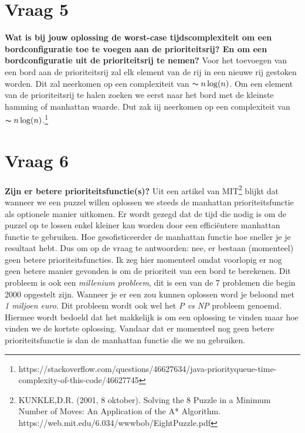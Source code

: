 \documentclass[12pt, letterpaper]{article}
\begin{document}
\section{Vraag 5}
\textbf{Wat is bij jouw oplossing de worst-case tijdscomplexiteit om een bordconfiguratie toe te voegen aan de prioriteitsrij? En om een bordconfiguratie uit de prioriteitsrij te nemen?}\newline
Voor het toevoegen van een bord aan de prioriteitsrij zal elk element van de rij in een nieuwe rij gestoken worden. Dit zal neerkomen op een complexiteit van $\thicksim n\log(n)$.
Om een element van de prioriteitsrij te halen zoeken we eerst naar het bord met de kleinste hamming of manhattan waarde. Dut zak iij neerkomen op een complexiteit van $\thicksim n\log(n)$.\footnote{https://stackoverflow.com/questions/46627634/java-priorityqueue-time-complexity-of-this-code/46627745}


\section{Vraag 6}
\textbf{Zijn er betere prioriteitsfunctie(s)?}\newline
Uit een artikel van MIT\footnote{KUNKLE,D.R. (2001, 8 oktober). Solving the 8 Puzzle in a Minimum Number of Moves: An Application of the A* Algorithm. https://web.mit.edu/6.034/wwwbob/EightPuzzle.pdf} blijkt dat 
wanneer we een puzzel willen oplossen we steeds de manhattan prioriteitsfunctie als optionele manier uitkomen. Er wordt gezegd dat de tijd die nodig is om de puzzel op te lossen
enkel kleiner kan worden door een efficiëntere manhattan functie te gebruiken. Hoe gesofisticeerder de manhattan functie hoe sneller je je resultaat hebt. Dus om op de vraag te antwoorden:
nee, er bestaan (momenteel) geen betere prioriteitsfuncties. Ik zeg hier momenteel omdat voorlopig er nog geen betere manier gevonden is om de prioriteit van een bord te berekenen.
Dit probleem is ook een \textit{millenium probleem}, dit is een van de 7 problemen die begin 2000 opgestelt zijn. Wanneer je er een zou kunnen oplossen word je beloond met \textit{1 miljoen euro}.
Dit probleem wordt ook wel het \textit{P vs NP} probleem genoemd. Hiermee wordt bedoeld dat het makkelijk is om een oplossing te vinden maar hoe vinden we de kortste oplossing.
Vandaar dat er momenteel nog geen betere prioriteitsfunctie is dan de manhattan functie die we nu gebruiken.
\end{document}
